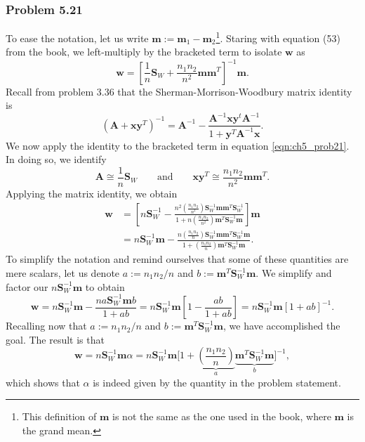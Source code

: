 \documentclass[12pt, a4paper]{article}
\newcommand{\vect}[1]{\bm{#1}}
\begin{document}
\subsubsection*{Problem 5.21}
To ease the notation, let us write $\vect{m} := \vect{m}_1 - \vect{m}_2$\footnote{This definition of $\vect{m}$ is not the same as the one used in the book, where $\vect{m}$ is the grand mean.}.
Staring with equation (53) from the book, we left-multiply by the bracketed term to isolate $\vect{w}$ as 
\begin{equation}
\label{eqn:ch5_prob21}
	\vect{w} = \left[ \frac{1}{n} \vect{S}_W + \frac{n_1 n_2}{n^2} \vect{m} \vect{m}^T \right]^{-1} \vect{m}.
\end{equation}
Recall from problem 3.36 that the Sherman-Morrison-Woodbury matrix identity is 
\begin{equation*}
	\left(\vect{A} + \vect{x}\vect{y}^T\right)^{-1} =
	\vect{A}^{-1} - \frac{\vect{A}^{-1} \vect{x} \vect{y}^t \vect{A}^{-1}}{1 + \vect{y}^T \vect{A}^{-1} \vect{x}}.
\end{equation*}
We now apply the identity to the bracketed term in equation \eqref{eqn:ch5_prob21}.
In doing so, we identify 
\begin{equation*}
	\vect{A} \cong \frac{1}{n} \vect{S}_W 
	\quad \quad \text{and} \quad \quad
	\vect{x}\vect{y}^T \cong \frac{n_1 n_2}{n^2} \vect{m} \vect{m}^T.
\end{equation*}
Applying the matrix identity, we obtain
\begin{align*}
	\vect{w} &= \left[ n \vect{S}_W^{-1} - \frac{
		n^2 \left( \frac{n_1 n_2}{n^2} \right)
		\vect{S}_W^{-1} \vect{m} \vect{m}^T \vect{S}_W^{-1}
		}{
		1 + n \left( \frac{n_1 n_2}{n^2} \right) \vect{m}^T \vect{S}_W^{-1} \vect{m} 
		}  \right] \vect{m} \\
		&=
		n \vect{S}_W^{-1}\vect{m} - \frac{
			n \left( \frac{n_1 n_2}{n} \right)
			\vect{S}_W^{-1} \vect{m} \vect{m}^T \vect{S}_W^{-1}\vect{m}
		}{
		1 +  \left( \frac{n_1 n_2}{n} \right) \vect{m}^T \vect{S}_W^{-1} \vect{m} 
	}.
\end{align*}
To simplify the notation and remind ourselves that some of these quantities are mere scalars, let us denote $a:= n_1 n_2 / n$ and $b := \vect{m}^T \vect{S}_W^{-1} \vect{m} $.
We simplify and factor our $n \vect{S}_W^{-1} \vect{m}$ to obtain
\begin{equation*}
	\vect{w} = n \vect{S}_W^{-1}\vect{m} - \frac{
		n a
		\vect{S}_W^{-1} \vect{m} b
	}{
	1 +  a b }
	=
	n \vect{S}_W^{-1} \vect{m} \left[ 1  - \frac{ab}{1 + ab} \right]
	=
	n \vect{S}_W^{-1} \vect{m} \left[ 1  + ab \right]^{-1}.
\end{equation*}
Recalling now that $a:= n_1 n_2 / n$ and $b := \vect{m}^T \vect{S}_W^{-1} \vect{m} $, we have accomplished the goal.
The result is that
\begin{equation*}
	\vect{w} = n \vect{S}_W^{-1} \vect{m} \alpha = n \vect{S}_W^{-1} \vect{m} \big[ 1 + \underbrace{\left( \frac{n_1 n_2}{n} \right)}_a \underbrace{\vect{m}^T \vect{S}_W^{-1} \vect{m}}_b \big]^{-1},
\end{equation*}
which shows that $\alpha$ is indeed given by the quantity in the problem statement.
\end{document}
